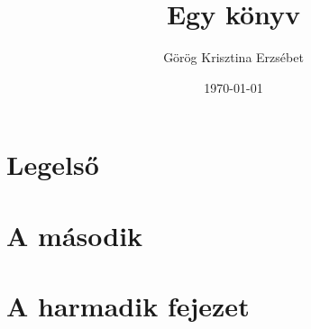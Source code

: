 \documentclass{book}
\title{Egy könyv}
\author{Görög Krisztina Erzsébet}
\date{\today}
\begin{document}
\frontmatter

\maketitle
\tableofcontents

\mainmatter

\chapter{Legelső}
\hulipsum[3]
\cite{abrharber03}
\cite{bujfaz}
\hulipsum[1]
\cite{g4gbin}
\chapter{A második}
\hulipsum
\chapter{A harmadik fejezet}
\hulipsum[2]
\cite{knuth84}
\cite{lamport94}
\cite{tomacs21}

\backmatter



\end{document}
